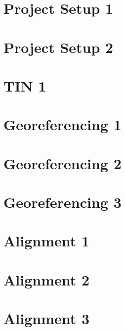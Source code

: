 \documentclass{scrartcl}
\begin{document}
\tableofcontents
\clearpage

\section{Project Setup 1}
\label{sec:project_setup_1}
\clearpage

\section{Project Setup 2}
\label{sec:project_setup_2}
\clearpage


\section{TIN 1}
\label{sec:tin_1}
\clearpage

\section{Georeferencing 1}
\label{sec:georeferencing_1}
\clearpage

\section{Georeferencing 2}
\label{sec:georeferencing_2}
\clearpage

\section{Georeferencing 3}
\label{sec:georeferencing_3}
\clearpage


\section{Alignment 1}
\label{sec:align_1}
\clearpage

\section{Alignment 2}
\label{sec:align_2}
\clearpage

\section{Alignment 3}
\label{sec:align_3}
\clearpage
\end{document}
